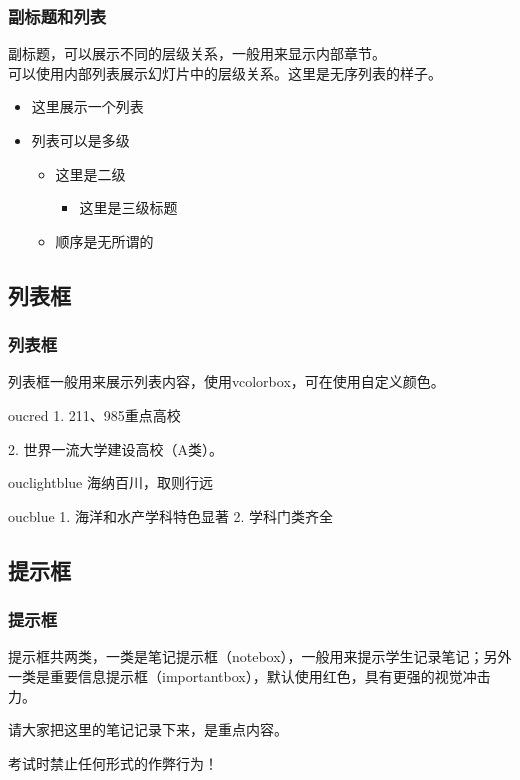\documentclass[aspectratio=169,UTF8,t]{beamer}%
\begin{document}
\begin{frame}
    \frametitle{副标题和列表}
    副标题，可以展示不同的层级关系，一般用来显示内部章节。\\
    可以使用内部列表展示幻灯片中的层级关系。这里是无序列表的样子。
    \begin{itemize}
        \item 这里展示一个列表 
        \item 列表可以是多级
        \begin{itemize}
            \item 这里是二级
            \begin{itemize}
                \item 这里是三级标题
            \end{itemize}
            \item 顺序是无所谓的
        \end{itemize}
    \end{itemize}
\end{frame}

\subsection{列表框}

\begin{frame}
    \frametitle{列表框}
    列表框一般用来展示列表内容，使用vcolorbox，可在使用自定义颜色。
    \begin{vcolorbox}[中国海洋大学]{oucred}
        1. 211、985重点高校

        2. 世界一流大学建设高校（A类）。
    \end{vcolorbox}
    \begin{vcolorbox}[学校校训]{ouclightblue}
        海纳百川，取则行远
    \end{vcolorbox}
    \begin{vcolorbox}[学校特色]{oucblue}
        1. 海洋和水产学科特色显著
        2. 学科门类齐全
    \end{vcolorbox}
\end{frame}

\subsection{提示框}

\begin{frame}
    \frametitle{提示框}
    提示框共两类，一类是笔记提示框（notebox），一般用来提示学生记录笔记；另外一类是重要信息提示框（importantbox），默认使用红色，具有更强的视觉冲击力。
      \begin{notebox}[笔记]
        请大家把这里的笔记记录下来，是重点内容。 
      \end{notebox}
      \begin{importantbox}[重要]
        考试时禁止任何形式的作弊行为！
      \end{importantbox}              
\end{frame}
\end{document}
